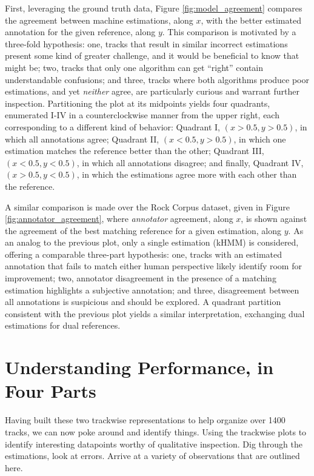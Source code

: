 \documentclass{article}
\begin{document}
First, leveraging the ground truth data, Figure \ref{fig:model_agreement} compares the agreement between machine estimations, along $x$, with the better estimated annotation for the given reference, along $y$.
This comparison is motivated by a three-fold hypothesis:
one, tracks that result in similar incorrect estimations present some kind of greater challenge, and it would be beneficial to know that might be;
two, tracks that only one algorithm can get ``right'' contain understandable confusions;
and three, tracks where both algorithms produce poor estimations, and yet \emph{neither} agree, are particularly curious and warrant further inspection.
Partitioning the plot at its midpoints yields four quadrants, enumerated I-IV in a counterclockwise manner from the upper right, each corresponding to a different kind of behavior:
Quadrant I, $(x > 0.5, y > 0.5)$, in which all annotations agree;
Quadrant II, $(x < 0.5, y > 0.5)$, in which one estimation matches the reference better than the other;
Quadrant III, $(x < 0.5, y < 0.5)$, in which all annotations disagree;
and finally, Quadrant IV, $(x > 0.5, y < 0.5)$, in which the estimations agree more with each other than the reference.


A similar comparison is made over the Rock Corpus dataset, given in Figure \ref{fig:annotator_agreement}, where \emph{annotator} agreement, along $x$, is shown against the agreement of the best matching reference for a given estimation, along $y$.
As an analog to the previous plot, only a single estimation (kHMM) is considered, offering a comparable three-part hypothesis:
one, tracks with an estimated annotation that fails to match either human perspective likely identify room for improvement;
two, annotator disagreement in the presence of a matching estimation highlights a subjective annotation;
and three, disagreement between all annotations is suspicious and should be explored.
A quadrant partition consistent with the previous plot yields a similar interpretation, exchanging dual estimations for dual references.


\section{Understanding Performance, in Four Parts}
\label{sec:data_analysis}

Having built these two trackwise representations to help organize over 1400 tracks, we can now poke around and identify things.
Using the trackwise plots to identify interesting datapoints worthy of qualitative inspection.
Dig through the estimations, look at errors.
Arrive at a variety of observations that are outlined here.
\end{document}
